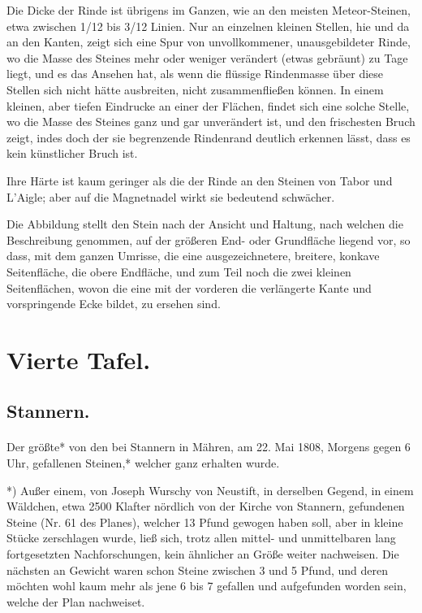 \documentclass[a4paper, 11pt, oneside, german]{article}
\begin{document}
Die Dicke der Rinde ist übrigens im Ganzen, wie an den meisten Meteor-Steinen, etwa zwischen 1/12 bis 3/12 Linien. Nur an einzelnen kleinen Stellen, hie und da an den Kanten, zeigt sich eine Spur von unvollkommener, unausgebildeter Rinde, wo die Masse des Steines mehr oder weniger verändert (etwas gebräunt) zu Tage liegt, und es das Ansehen hat, als wenn die flüssige Rindenmasse über diese Stellen sich nicht hätte ausbreiten, nicht zusammenfließen können. In einem kleinen, aber tiefen Eindrucke an einer der Flächen, findet sich eine solche Stelle, wo die Masse des Steines ganz und gar unverändert ist, und den frischesten Bruch zeigt, indes doch der sie begrenzende Rindenrand deutlich erkennen lässt, dass es kein künstlicher Bruch ist.

Ihre Härte ist kaum geringer als die der Rinde an den Steinen von Tabor und L'Aigle; aber auf die Magnetnadel wirkt sie bedeutend schwächer.

Die Abbildung stellt den Stein nach der Ansicht und Haltung, nach welchen die Beschreibung genommen, auf der größeren End- oder Grundfläche liegend vor, so dass, mit dem ganzen Umrisse, die eine ausgezeichnetere, breitere, konkave Seitenfläche, die obere Endfläche, und zum Teil noch die zwei kleinen Seitenflächen, wovon die eine mit der vorderen die verlängerte Kante und vorspringende Ecke bildet, zu ersehen sind.
\clearpage
\section{Vierte Tafel.}
\subsection{Stannern.}
\paragraph{}
Der größte* von den bei Stannern in Mähren, am 22. Mai 1808, Morgens gegen 6 Uhr, gefallenen Steinen,* welcher ganz erhalten wurde.

*) Außer einem, von Joseph Wurschy von Neustift, in derselben Gegend, in einem Wäldchen, etwa 2500 Klafter nördlich von der Kirche von Stannern, gefundenen Steine (Nr. 61 des Planes), welcher 13 Pfund gewogen haben soll, aber in kleine Stücke zerschlagen wurde, ließ sich, trotz allen mittel- und unmittelbaren lang fortgesetzten Nachforschungen, kein ähnlicher an Größe weiter nachweisen. Die nächsten an Gewicht waren schon Steine zwischen 3 und 5 Pfund, und deren möchten wohl kaum mehr als jene 6 bis 7 gefallen und aufgefunden worden sein, welche der Plan nachweiset.
\end{document}
